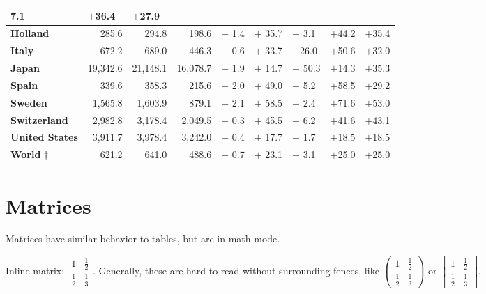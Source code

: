 \documentclass{article}
\begin{document}
\begin{center}
\begin{tabular}{llllcllcl}
7.1 & \multicolumn{1}{l}{$+$36.4} & $+$27.9 \\ \hline
\textbf{Holland} & \multicolumn{1}{r}{285.6} & \multicolumn{1}{r}{294.8} & 
\multicolumn{1}{r}{198.6} & \multicolumn{1}{l}{$-$ 1.4} & $+$ 35.7 & $-$ 3.1
& \multicolumn{1}{l}{$+$44.2} & $+$35.4 \\ \hline
\textbf{Italy} & \multicolumn{1}{r}{672.2} & \multicolumn{1}{r}{689.0} & 
\multicolumn{1}{r}{446.3} & \multicolumn{1}{l}{$-$ 0.6} & $+$ 33.7 & $-$26.0
& \multicolumn{1}{l}{$+$50.6} & $+$32.0 \\ \hline
\textbf{Japan} & \multicolumn{1}{r}{19,342.6} & \multicolumn{1}{r}{21,148.1}
& \multicolumn{1}{r}{16,078.7} & \multicolumn{1}{l}{$+$ 1.9} & $+$ 14.7 & $-$%
50.3 & \multicolumn{1}{l}{$+$14.3} & $+$35.3 \\ \hline
\textbf{Spain} & \multicolumn{1}{r}{339.6} & \multicolumn{1}{r}{358.3} & 
\multicolumn{1}{r}{215.6} & \multicolumn{1}{l}{$-$ 2.0} & $+$ 49.0 & $-$ 5.2
& \multicolumn{1}{l}{$+$58.5} & $+$29.2 \\ \hline
\textbf{Sweden} & \multicolumn{1}{r}{1,565.8} & \multicolumn{1}{r}{1,603.9}
& \multicolumn{1}{r}{879.1} & \multicolumn{1}{l}{$+$ 2.1} & $+$ 58.5 & $-$
2.4 & \multicolumn{1}{l}{$+$71.6} & $+$53.0 \\ \hline
\textbf{Switzerland} & \multicolumn{1}{r}{2,982.8} & \multicolumn{1}{r}{
3,178.4} & \multicolumn{1}{r}{2,049.5} & \multicolumn{1}{l}{$-$ 0.3} & $+$
45.5 & $-$ 6.2 & \multicolumn{1}{l}{$+$41.6} & $+$43.1 \\ \hline
\textbf{United States} & \multicolumn{1}{r}{3,911.7} & \multicolumn{1}{r}{
3,978.4} & \multicolumn{1}{r}{3,242.0} & \multicolumn{1}{l}{$-$ 0.4} & $+$
17.7 & $-$ 1.7 & \multicolumn{1}{l}{$+$18.5} & $+$18.5 \\ \hline
\textbf{World }$\dagger $ & \multicolumn{1}{r}{621.2} & \multicolumn{1}{r}{
641.0} & \multicolumn{1}{r}{488.6} & \multicolumn{1}{l}{$-$ 0.7} & $+$ 23.1
& $-$ 3.1 & \multicolumn{1}{l}{$+$25.0} & $+$25.0 \\ \hline
\end{tabular}
\end{center}

\section{Matrices}

Matrices have similar behavior to tables, but are in math mode.

Inline matrix: $%
\begin{array}{cc}
1 & \frac{1}{2} \\ 
\frac{1}{2} & \frac{1}{3}%
\end{array}%
$. Generally, these are hard to read without surrounding fences, like $%
\left( 
\begin{array}{cc}
1 & \frac{1}{2} \\ 
\frac{1}{2} & \frac{1}{3}%
\end{array}%
\right) $ or $\left[ 
\begin{array}{cc}
1 & \frac{1}{2} \\ 
\frac{1}{2} & \frac{1}{3}%
\end{array}%
\right] $.
\end{document}
